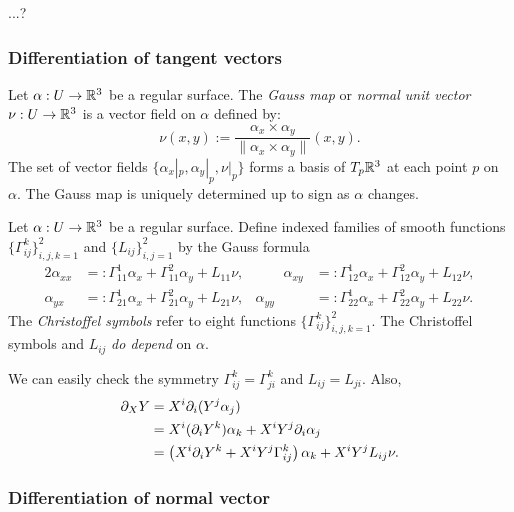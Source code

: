 \documentclass{../exp}
\def\a{\alpha}
\begin{document}
\begin{thm}
...?
\end{thm}


\subsubsection{Differentiation of tangent vectors}



\begin{defn}
Let $\a:U\to\R^3$ be a regular surface.
The \emph{Gauss map} or \emph{normal unit vector} $\nu:U\to\R^3$ is a vector field on $\a$ defined by:
\[\nu(x,y):=\frac{\a_x\times \a_y}{\|\a_x\times \a_y\|}(x,y).\]
The set of vector fields $\{\a_x|_p,\a_y|_p,\nu|_p\}$ forms a basis of $T_p\mathbb{R}^3$ at each point $p$ on $\a$.
The Gauss map is uniquely determined up to sign as $\a$ changes.
\end{defn}

\begin{defn}
Let $\a:U\to\R^3$ be a regular surface.
Define indexed families of smooth functions $\{\Gamma_{ij}^k\}_{i,j,k=1}^2$ and $\{L_{ij}\}_{i,j=1}^2$ by the Gauss formula
\begin{alignat*}{2}
\a_{xx}&=:\Gamma_{11}^1\a_x+\Gamma_{11}^2\a_y+L_{11}\nu,&\qquad
\a_{xy}&=:\Gamma_{12}^1\a_x+\Gamma_{12}^2\a_y+L_{12}\nu,\\
\a_{yx}&=:\Gamma_{21}^1\a_x+\Gamma_{21}^2\a_y+L_{21}\nu,&
\a_{yy}&=:\Gamma_{22}^1\a_x+\Gamma_{22}^2\a_y+L_{22}\nu.
\end{alignat*}
The \emph{Christoffel symbols} refer to eight functions $\{\Gamma_{ij}^k\}_{i,j,k=1}^2$.
The Christoffel symbols and $L_{ij}$ \emph{do depend} on $\a$.
\end{defn}
We can easily check the symmetry $\Gamma_{ij}^k=\Gamma_{ji}^k$ and $L_{ij}=L_{ji}$.
Also,
\begin{align*}
\pd_XY
&=X^i\pd_i(Y^j\a_j)\\
&=X^i(\pd_iY^k)\a_k+X^iY^j\pd_i\a_j\\
&=\left(X^i\pd_iY^k+X^iY^j\Gamma_{ij}^k\right)\a_k+X^iY^jL_{ij}\nu.
\end{align*}



\subsubsection{Differentiation of normal vector}
\end{document}

